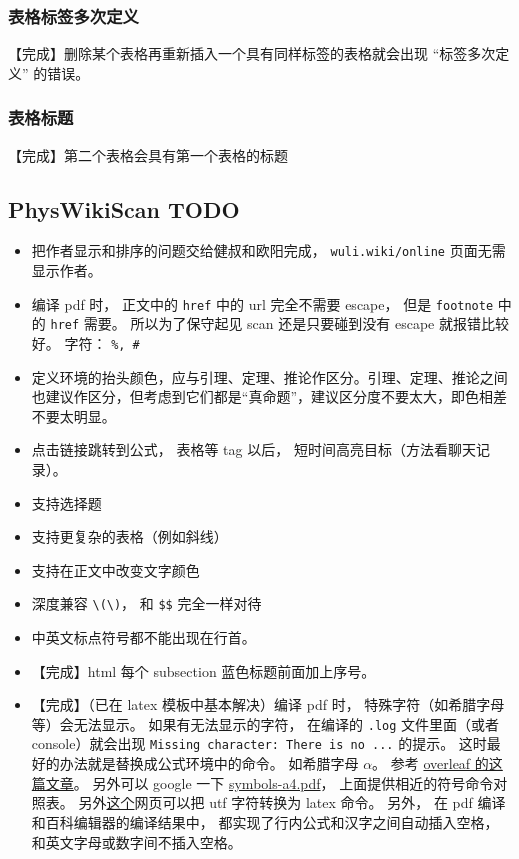 \subsubsection{表格标签多次定义}
【完成】删除某个表格再重新插入一个具有同样标签的表格就会出现 “标签多次定义” 的错误。

\subsubsection{表格标题}
【完成】第二个表格会具有第一个表格的标题

\subsection{PhysWikiScan TODO}
\begin{itemize}
\item 把作者显示和排序的问题交给健叔和欧阳完成， \verb|wuli.wiki/online| 页面无需显示作者。

\item 编译 pdf 时， 正文中的 \verb|href| 中的 url 完全不需要 escape， 但是 \verb|footnote| 中的 \verb|href| 需要。 所以为了保守起见 scan 还是只要碰到没有 escape 就报错比较好。 字符： \verb|%, #|

\item 定义环境的抬头颜色，应与引理、定理、推论作区分。引理、定理、推论之间也建议作区分，但考虑到它们都是“真命题”，建议区分度不要太大，即色相差不要太明显。

\item 点击链接跳转到公式， 表格等 tag 以后， 短时间高亮目标（方法看聊天记录）。

\item 支持选择题

\item 支持更复杂的表格（例如斜线）

\item 支持在正文中改变文字颜色

\item 深度兼容 \lstinline|\(\)|， 和 \lstinline|$$| 完全一样对待

\item 中英文标点符号都不能出现在行首。

\item 【完成】html 每个 subsection 蓝色标题前面加上序号。

\item 【完成】（已在 latex 模板中基本解决）编译 pdf 时， 特殊字符（如希腊字母等）会无法显示。 如果有无法显示的字符， 在编译的 \verb|.log| 文件里面（或者 console）就会出现 \verb|Missing character: There is no ...| 的提示。 这时最好的办法就是替换成公式环境中的命令。 如希腊字母 $\alpha$。 参考 \href{https://www.overleaf.com/learn/how-to/What_file_encodings_and_line_endings_should_I_use\%3F}{overleaf 的这篇文章}。 另外可以 google 一下 \href{https://tug.ctan.org/info/symbols/comprehensive/symbols-a4.pdf}{symbols-a4.pdf}， 上面提供相近的符号命令对照表。 另外\href{https://www.johndcook.com/unicode_latex.html}{这个}网页可以把 utf 字符转换为 latex 命令。 另外， 在 pdf 编译和百科编辑器的编译结果中， 都实现了行内公式和汉字之间自动插入空格， 和英文字母或数字间不插入空格。


\end{itemize}
